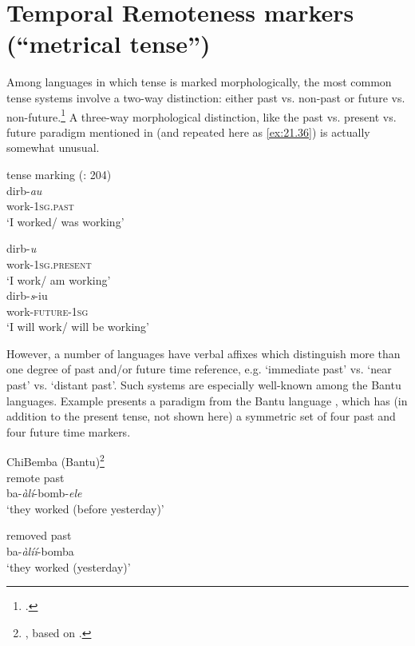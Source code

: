 \section{Temporal Remoteness markers (“metrical tense”)}\label{sec:21.5}

Among languages in which tense is marked morphologically, the most common tense systems involve a two-way distinction: either past vs. non-past or future vs. non-future.\footnote{\citet{ChungTimberlake1985}.} A three-way morphological distinction, like the  past vs. present vs. future paradigm mentioned in  (and repeated here as \ref{ex:21.36}) is actually somewhat unusual.


\ea \label{ex:21.36}
{ tense marking} (\citealt{ChungTimberlake1985}: 204)\\
\ea  
\gll dirb-\textit{au}\\
work-\textsc{1sg}\textsc{.past} \\
\glt ‘I worked/ was working’

\ex
\gll dirb-\textit{u}\\
work-\textsc{1sg}\textsc{.present} \\
\glt ‘I work/ am working’\\

\ex
\gll dirb-\textit{s}-iu\\
work-\textsc{future}-\textsc{1sg} \\
\glt ‘I will work/ will be working’
\z
\z

However, a number of languages have verbal affixes which distinguish more than one degree of past and/or future time reference, e.g. ‘immediate past’ vs. ‘near past’ vs. ‘distant past’. Such systems are especially well-known among the  {Bantu} languages. Example  presents a paradigm from the {Bantu} language , which has (in addition to the present tense, not shown here) a symmetric set of four past and four future time markers.

\ea \label{ex:21.37}
{ChiBemba ({Bantu})}\footnote{\citet[208]{ChungTimberlake1985}, based on \citet{Givón1972}.} \\
\ea  remote past\\
    ba-\textit{àlí}-bomb-\textit{ele}   \\
\glt‘they worked (before yesterday)’

\ex removed past\\
     ba-\textit{àlíí}-bomba   \\
\glt‘they worked (yesterday)’

